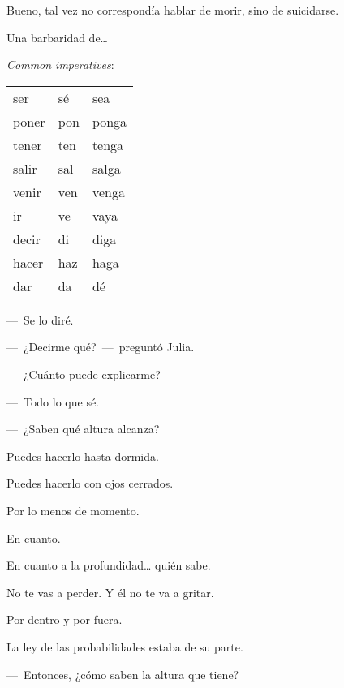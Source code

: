 \sk
Bueno, tal vez no correspondía hablar de morir, sino de suicidarse. 

\sk
Una barbaridad de\ldots{} 

\bigskip
\textit{Common imperatives}:

\sk
\begin{tabular}{lll}
    ser   & sé  & sea\\
    poner & pon & ponga\\
    tener & ten & tenga\\
    salir & sal & salga\\
    venir & ven & venga\\
    ir    & ve  & vaya\\
    decir & di  & diga\\
    hacer & haz & haga\\
    dar   & da  & dé\\
\end{tabular}

\bigskip
---~Se lo diré. 

---~¿Decirme qué?~---~preguntó Julia. 

\sk
---~¿Cuánto puede explicarme? 

---~Todo lo que sé. 

\sk
---~¿Saben qué altura alcanza? 

\sk
Puedes hacerlo hasta dormida. 

\sk
Puedes hacerlo con ojos cerrados. 

\sk
Por lo menos de momento. 

\sk
En cuanto. 

\sk
En cuanto a la profundidad\ldots{} quién sabe. 

\sk
No te vas a perder. Y él no te va a gritar. 

\sk
Por dentro y por fuera. 

\sk
La ley de las probabilidades estaba de su parte. 


\sk
---~Entonces, ¿cómo saben la altura que tiene? 

